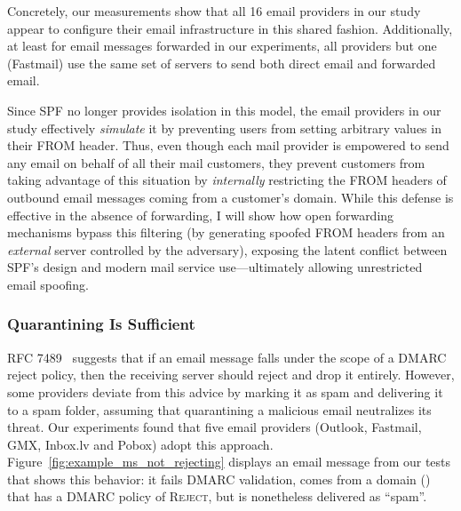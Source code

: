 Concretely, our measurements show that all 16 email providers in our study appear to configure their email infrastructure in this shared fashion.
Additionally, at least for email messages forwarded in our experiments, all providers but one (Fastmail) use the same set of servers to send both direct email and forwarded email.

Since SPF no longer provides isolation in this model, the email
providers in our study effectively \emph{simulate} it by preventing users
from setting arbitrary values in their \textsc{FROM} header.  Thus,
even though each mail provider is empowered to send any email on
behalf of all their mail customers, they prevent customers from taking
advantage of this situation by \emph{internally} restricting the \textsc{FROM} headers of outbound email messages coming from a customer's domain.
While this defense is effective in the absence of forwarding, I will
show how open forwarding mechanisms bypass this filtering (by generating spoofed \textsc{FROM} headers from an \emph{external} server controlled by the adversary),
exposing the latent conflict between SPF's design and modern mail service
use---ultimately allowing unrestricted email spoofing.



\subsubsection{Quarantining Is Sufficient}
\label{subsubsec:quarantine_instead_of_reject}
RFC 7489~\cite{rfc5231} suggests that if an email message falls under the scope of a DMARC reject policy, then the receiving server should reject and drop it entirely. However, some providers deviate from this advice by marking it as spam and delivering it to a spam folder, assuming that quarantining a malicious email neutralizes its threat.
Our experiments found that five email providers (Outlook, Fastmail, GMX, Inbox.lv and Pobox) adopt this approach.
Figure~\ref{fig:example_ms_not_rejecting} displays an email message from our tests that shows this behavior: it fails DMARC validation, comes from a domain () that has a DMARC policy of \textsc{Reject}, but is nonetheless delivered
as ``spam''.

